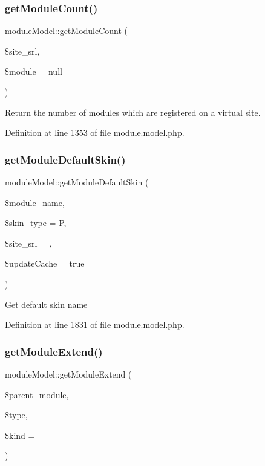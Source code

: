 \subsubsection{\texorpdfstring{get\+Module\+Count()}{getModuleCount()}}
{\footnotesize\ttfamily module\+Model\+::get\+Module\+Count (\begin{DoxyParamCaption}\item[{}]{\$site\+\_\+srl,  }\item[{}]{\$module = {\ttfamily null} }\end{DoxyParamCaption})}



Return the number of modules which are registered on a virtual site. 



Definition at line 1353 of file module.\+model.\+php.

\mbox{\label{classmoduleModel_a740b445ffb57b7f7304cb7acf9f3f5b1}} 
\subsubsection{\texorpdfstring{get\+Module\+Default\+Skin()}{getModuleDefaultSkin()}}
{\footnotesize\ttfamily module\+Model\+::get\+Module\+Default\+Skin (\begin{DoxyParamCaption}\item[{}]{\$module\+\_\+name,  }\item[{}]{\$skin\+\_\+type = {\ttfamily \textquotesingle{}P\textquotesingle{}},  }\item[{}]{\$site\+\_\+srl = {},  }\item[{}]{\$update\+Cache = {\ttfamily true} }\end{DoxyParamCaption})}

Get default skin name 

Definition at line 1831 of file module.\+model.\+php.

\mbox{\label{classmoduleModel_a1dd3c03b874a4f6e05f6b5e8ec283665}} 
\subsubsection{\texorpdfstring{get\+Module\+Extend()}{getModuleExtend()}}
{\footnotesize\ttfamily module\+Model\+::get\+Module\+Extend (\begin{DoxyParamCaption}\item[{}]{\$parent\+\_\+module,  }\item[{}]{\$type,  }\item[{}]{\$kind = {\ttfamily \textquotesingle{}\textquotesingle{}} }\end{DoxyParamCaption})}



